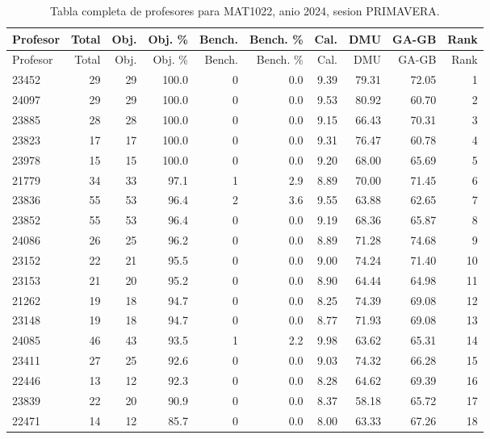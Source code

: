 \begingroup
\scriptsize
\setlength{\tabcolsep}{3pt}
\begin{longtable}{lrrrrrrrrr}
\caption{Tabla completa de profesores para MAT1022, anio 2024, sesion PRIMAVERA.}\label{tab:prof-period-mat1022-2024-primavera-especializado}\\
\toprule
Profesor & Total & Obj. & Obj. \% & Bench. & Bench. \% & Cal. & DMU & GA-GB & Rank \\
\midrule
\endfirsthead
\toprule
Profesor & Total & Obj. & Obj. \% & Bench. & Bench. \% & Cal. & DMU & GA-GB & Rank \\
\midrule
\endhead
23452 & 29 & 29 & 100.0 & 0 & 0.0 & 9.39 & 79.31 & 72.05 & 1 \\
24097 & 29 & 29 & 100.0 & 0 & 0.0 & 9.53 & 80.92 & 60.70 & 2 \\
23885 & 28 & 28 & 100.0 & 0 & 0.0 & 9.15 & 66.43 & 70.31 & 3 \\
23823 & 17 & 17 & 100.0 & 0 & 0.0 & 9.31 & 76.47 & 60.78 & 4 \\
23978 & 15 & 15 & 100.0 & 0 & 0.0 & 9.20 & 68.00 & 65.69 & 5 \\
21779 & 34 & 33 & 97.1 & 1 & 2.9 & 8.89 & 70.00 & 71.45 & 6 \\
23836 & 55 & 53 & 96.4 & 2 & 3.6 & 9.55 & 63.88 & 62.65 & 7 \\
23852 & 55 & 53 & 96.4 & 0 & 0.0 & 9.19 & 68.36 & 65.87 & 8 \\
24086 & 26 & 25 & 96.2 & 0 & 0.0 & 8.89 & 71.28 & 74.68 & 9 \\
23152 & 22 & 21 & 95.5 & 0 & 0.0 & 9.00 & 74.24 & 71.40 & 10 \\
23153 & 21 & 20 & 95.2 & 0 & 0.0 & 8.90 & 64.44 & 64.98 & 11 \\
21262 & 19 & 18 & 94.7 & 0 & 0.0 & 8.25 & 74.39 & 69.08 & 12 \\
23148 & 19 & 18 & 94.7 & 0 & 0.0 & 8.77 & 71.93 & 69.08 & 13 \\
24085 & 46 & 43 & 93.5 & 1 & 2.2 & 9.98 & 63.62 & 65.31 & 14 \\
23411 & 27 & 25 & 92.6 & 0 & 0.0 & 9.03 & 74.32 & 66.28 & 15 \\
22446 & 13 & 12 & 92.3 & 0 & 0.0 & 8.28 & 64.62 & 69.39 & 16 \\
23839 & 22 & 20 & 90.9 & 0 & 0.0 & 8.37 & 58.18 & 65.72 & 17 \\
22471 & 14 & 12 & 85.7 & 0 & 0.0 & 8.00 & 63.33 & 67.26 & 18 \\
\bottomrule
\end{longtable}
\endgroup

